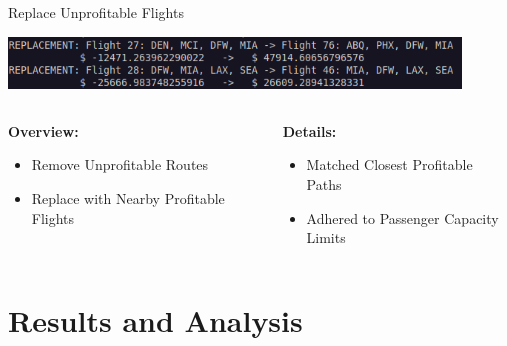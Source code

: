 \documentclass[aspectratio=169,xcolor=dvipsnames]{beamer}
\begin{document}
\begin{frame}{Replace Unprofitable Flights}
    \begin{minipage}[t]{\textwidth}
        \centering
        \includegraphics[width=0.9\textwidth, height=0.225\textheight]{images/replace_candidate.png}
    \end{minipage}
    \hfill
    \vspace{0.25cm} %
    \begin{minipage}[t]{\textwidth}
        \begin{columns}[t]
            \begin{column}{0.45\textwidth}
                \centering
                \LARGE\textbf{Overview:}
                \begin{itemize}
                    \large\item Remove Unprofitable Routes
                    \large\item Replace with Nearby Profitable Flights
                \end{itemize}
            \end{column}
            \begin{column}{0.05\textwidth} %
            \end{column}
            \begin{column}{0.5\textwidth}
                \centering
                \LARGE\textbf{Details:}
                \begin{itemize}
                    \large\item Matched Closest Profitable Paths
                    \large\item  Adhered to Passenger Capacity Limits
                \end{itemize}
            \end{column}
        \end{columns}
    \end{minipage} 
\end{frame}

\section{Results and Analysis}
\end{document}
